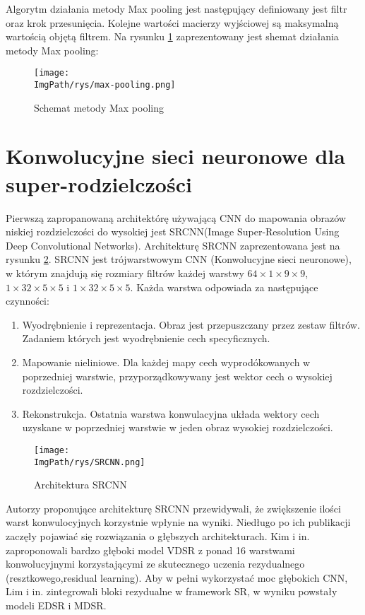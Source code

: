\documentclass[a4paper,12pt,twoside,openany]{report}
\newcommand{\ImgPath}{.}
\begin{document}
Algorytm działania metody Max pooling jest następujący definiowany jest filtr oraz krok przesunięcia. Kolejne wartości macierzy wyjściowej są maksymalną wartością objętą filtrem. Na rysunku \ref{schematMaxPooling}  zaprezentowany jest shemat działania metody Max pooling:

\begin{figure}[!htbp]
	\begin{center}
		\centering
		\texttt{[image: \\ImgPath/rys/max-pooling.png]}
	\end{center}
	\caption{Schemat metody Max pooling}
	\label{schematMaxPooling}
\end{figure}

\section{Konwolucyjne sieci neuronowe dla super-rodzielczości}
Pierwszą zapropanowaną architektórę używającą CNN do mapowania obrazów niskiej rozdzielczości do wysokiej jest SRCNN(Image Super-Resolution Using Deep Convolutional Networks). Architekturę SRCNN zaprezentowana jest na rysunku \ref{archSRCNN}. SRCNN jest trójwarstwowym CNN (Konwolucyjne sieci neuronowe), w którym znajdują się rozmiary filtrów każdej warstwy $64 \times 1 \times 9 \times 9$, $1 \times 32 \times 5 \times 5$ i $1 \times 32 \times 5 \times 5$.
Każda warstwa odpowiada za następujące czynności:
\begin{enumerate}
	\item Wyodrębnienie i reprezentacja. Obraz jest przepuszczany przez zestaw filtrów. Zadaniem których jest wyodrębnienie cech specyficznych.  
	\item Mapowanie nieliniowe. Dla każdej mapy cech wyprodókowanych w poprzedniej warstwie, przyporządkowywany jest wektor cech o wysokiej	rozdzielczości.
	\item Rekonstrukcja. Ostatnia warstwa konwulacyjna układa wektory cech uzyskane w poprzedniej warstwie w jeden obraz wysokiej rozdzielczości.
\end{enumerate}
\begin{figure}[!htbp]
	\begin{center}
		\centering
		\texttt{[image: \\ImgPath/rys/SRCNN.png]}
	\end{center}
	\caption{Architektura SRCNN}
	\label{archSRCNN}
\end{figure}

Autorzy proponujące architekturę SRCNN przewidywali, że zwiększenie ilości warst konwulocyjnych korzystnie wpłynie na wyniki. Niedługo po ich publikacji zaczęły pojawiać się rozwiązania o głębszych architekturach. Kim i in. zaproponowali bardzo głęboki model VDSR z ponad 16 warstwami konwolucyjnymi korzystającymi ze skutecznego uczenia rezydualnego (resztkowego,residual learning). Aby w pełni wykorzystać moc głębokich CNN, Lim i in. zintegrowali bloki rezydualne w framework SR, w wyniku powstały modeli EDSR i MDSR.
\end{document}
